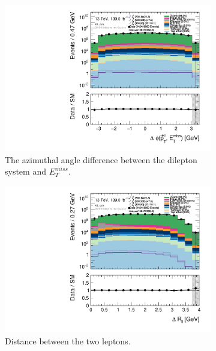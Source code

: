 \begin{figure}[H]
\begin{subfigure}[t!]{0.49\textwidth}
    \end{subfigure}
    \begin{subfigure}[t!]{0.49\textwidth}
        \includegraphics[width=\textwidth]{Figures/SlepSlep/CutAndCount/ML_cuts/hist1d_deltaPhi_ML_cuts.pdf}
    \caption{The azimuthal angle difference between the dilepton system and $E_T^{miss}$.}
    \label{fig:my_label}
    \end{subfigure}
    \begin{subfigure}[t!]{0.49\textwidth}
        \includegraphics[width=\textwidth]{Figures/SlepSlep/CutAndCount/ML_cuts/hist1d_deltaRll_ML_cuts.pdf}
    \caption{Distance between the two leptons.}
    \label{fig:my_label}
    \end{subfigure}
    \begin{subfigure}[t!]{0.49\textwidth}

\end{subfigure}
\end{figure}
